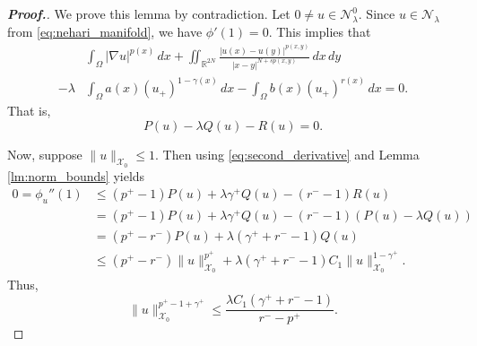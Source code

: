 \documentclass[11pt]{article}
\newcommand{\X}{\mathcal{X}_{0}}
\newcommand{\grad}{\nabla}
\begin{document}
\begin{proof}[\bf Proof.]
We prove this lemma by contradiction.
Let $0 \neq u \in \mathcal{N}_\lambda^0.$
Since $u \in \mathcal{N}_\lambda$
from \eqref{eq:nehari_manifold}, we have $\phi'(1) = 0.$
This implies that
\begin{align*} 
&
\int_\Omega |\grad u|^{p(x)} \, dx + 
\iint_{\mathbb{R}^{2N}} 
\frac{|u(x) - u(y)|^{p(x,y)}}
{|x - y|^{N + s p(x,y)}} \, dx \, dy \\
- 
  \lambda 
& \int_\Omega a(x) (u_+)^{1 - \gamma(x)} \, dx 
- 
\int_\Omega b(x) (u_+)^{r(x)} \, dx = 0.
\end{align*} 
That is,
\begin{equation*} 
P(u) - \lambda Q(u) - R(u) = 0.
\end{equation*}


 Now, suppose $\|u\|_{\X} \leq 1.$
Then using \eqref{eq:second_derivative} and 
Lemma \ref{lm:norm_bounds} yields
\begin{align*}
0 = \phi_u''(1) &\leq (p^+ - 1) P(u) 
+ \lambda \gamma^+ Q(u) - (r^- - 1) R(u) \\
&= (p^+ - 1) P(u) + \lambda \gamma^+ Q(u) - 
(r^- - 1) (P(u) - \lambda Q(u)) \\
&= 
\left (p^+ - r^- 
\right ) P(u) + \lambda (\gamma^+ + r^- - 1) Q(u) \\
&\leq 
\left (p^+ - r^- 
\right ) \|u\|_{\X}^{p^+} + \lambda 
(\gamma^+ + r^- - 1) C_1 \|u\|_{\X}^{1 - \gamma^+}.
\end{align*}
Thus,
\begin{equation} \label{eq:upper_bound_norm}
\|u\|_{\X}^{p^+ -1+ \gamma^+} \leq 
\frac{\lambda C_1 
\left ( \gamma^+ + r^- - 1 
\right )}{r^- - p^+}.
\end{equation}



\end{proof}
\end{document}

